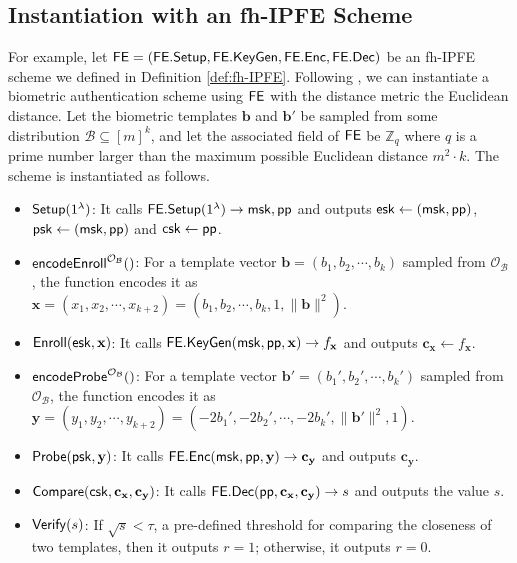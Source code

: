 \subsection{Instantiation with an fh-IPFE Scheme}
\label{sec:instantiation}

For example, let ${\sf FE} = ({\sf FE.Setup}, {\sf FE.KeyGen}, {\sf FE.Enc}, {\sf FE.Dec})$ be an fh-IPFE scheme we defined in Definition \ref{def:fh-IPFE}. Following \cite{cryptoeprint:2023/481}, we can instantiate a biometric authentication scheme using ${\sf FE}$ with the distance metric the Euclidean distance. Let the biometric templates $\mathbf{b}$ and $\mathbf{b'}$ be sampled from some distribution $\mathcal{B} \subseteq [m]^k$, and let the associated field of ${\sf FE}$ be $\mathbb{Z}_q$ where $q$ is a prime number larger than the maximum possible Euclidean distance $m^2 \cdot k$. The scheme is instantiated as follows.

\begin{itemize}

	\item ${\sf Setup}(1^\lambda)$: It calls ${\sf FE.Setup}(1^\lambda) \to {\sf msk}, {\sf pp}$ and outputs ${\sf esk} \gets ({\sf msk}, {\sf pp})$, ${\sf psk} \gets ({\sf msk}, {\sf pp})$ and ${\sf csk} \gets {\sf pp}$.

	\item ${\sf encodeEnroll}^{\mathcal{O}_{\mathcal{B}}}()$: For a template vector $\mathbf{b} = (b_1, b_2, \cdots, b_k)$ sampled from $\mathcal{O}_{\mathcal{B}}$, the function encodes it as $\mathbf{x} = (x_1, x_2, \cdots, x_{k+2}) = (b_1, b_2, \cdots, b_k, 1, \|\mathbf{b}\|^2)$. 

	\item ${\sf Enroll}({\sf esk}, \mathbf{x})$: It calls ${\sf FE.KeyGen}({\sf msk}, {\sf pp}, \mathbf{x}) \to f_\mathbf{x}$ and outputs $\mathbf{c_x} \gets f_\mathbf{x}$.

	\item ${\sf encodeProbe}^{\mathcal{O}_{\mathcal{B}}}()$: For a template vector $\mathbf{b'} = (b_1', b_2', \cdots, b_k')$ sampled from $\mathcal{O}_{\mathcal{B}}$, the function encodes it as $\mathbf{y} = (y_1, y_2, \cdots, y_{k+2}) = (-2b_1', -2b_2', \cdots, -2b_k', \|\mathbf{b'}\|^2, 1)$.

	\item ${\sf Probe}({\sf psk}, \mathbf{y})$: It calls ${\sf FE.Enc}({\sf msk}, {\sf pp}, \mathbf{y}) \to \mathbf{c_y}$ and outputs $\mathbf{c_y}$.

	\item ${\sf Compare}({\sf csk}, \mathbf{c_x}, \mathbf{c_y)}$: It calls ${\sf FE.Dec}({\sf pp}, \mathbf{c_x}, \mathbf{c_y}) \to s$ and outputs the value $s$.

	\item ${\sf Verify}(s)$: If $\sqrt{s} < \tau$, a pre-defined threshold for comparing the closeness of two templates, then it outputs $r = 1$; otherwise, it outputs $r = 0$.

\end{itemize}

